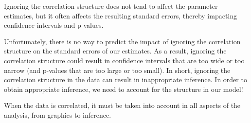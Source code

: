 \documentclass[
  letterpaper,
  DIV=11,
  numbers=noendperiod]{scrreprt}
\theoremstyle{definition}
\theoremstyle{definition}
\theoremstyle{remark}
\begin{document}
\begin{tcolorbox}[enhanced jigsaw, bottomrule=.15mm, titlerule=0mm, bottomtitle=1mm, colback=white, coltitle=black, rightrule=.15mm, leftrule=.75mm, toprule=.15mm, toptitle=1mm, left=2mm, opacityback=0, colframe=quarto-callout-tip-color-frame, breakable, title=\textcolor{quarto-callout-tip-color}{\faLightbulb}\hspace{0.5em}{Big Idea}, arc=.35mm, colbacktitle=quarto-callout-tip-color!10!white, opacitybacktitle=0.6]

Ignoring the correlation structure does not tend to affect the parameter
estimates, but it often affects the resulting standard errors, thereby
impacting confidence intervals and p-values.

\end{tcolorbox}

Unfortunately, there is no way to predict the impact of ignoring the
correlation structure on the standard errors of our estimates. As a
result, ignoring the correlation structure could result in confidence
intervals that are too wide or too narrow (and p-values that are too
large or too small). In short, ignoring the correlation structure in the
data can result in inappropriate inference. In order to obtain
appropriate inference, we need to account for the structure in our
model!

\begin{tcolorbox}[enhanced jigsaw, bottomrule=.15mm, titlerule=0mm, bottomtitle=1mm, colback=white, coltitle=black, rightrule=.15mm, leftrule=.75mm, toprule=.15mm, toptitle=1mm, left=2mm, opacityback=0, colframe=quarto-callout-tip-color-frame, breakable, title=\textcolor{quarto-callout-tip-color}{\faLightbulb}\hspace{0.5em}{Big Idea}, arc=.35mm, colbacktitle=quarto-callout-tip-color!10!white, opacitybacktitle=0.6]

When the data is correlated, it must be taken into account in all
aspects of the analysis, from graphics to inference.

\end{tcolorbox}
\end{document}
